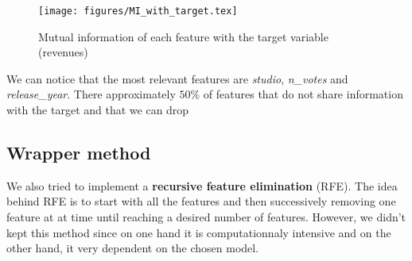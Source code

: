 \begin{figure}[H]
	\centering
	\texttt{[image: figures/MI\_with\_target.tex]}
	\caption{Mutual information of each feature with the target variable (revenues)}
	\label{fig:MI_with_target}
\end{figure}

We can notice that the most relevant features are \textit{studio}, \textit{n_votes} and \textit{release_year}. There approximately $50\%$ of features that do not share information with the target and that we can drop

\subsection{Wrapper method}

We also tried to implement a \textbf{recursive feature elimination} (RFE). The idea behind RFE is to start with all the features and then successively removing one feature at at time until reaching a desired number of features. However, we didn't kept this method since on one hand it is computationnaly intensive and on the other hand, it very dependent on the chosen model.

